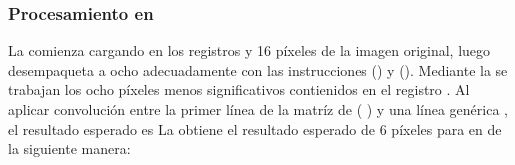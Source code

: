 \subsubsection{Procesamiento en }
	La   comienza cargando en los registros  y  16 píxeles de la imagen original, 
luego desempaqueta a ocho  adecuadamente con las instrucciones  () y  
(). Mediante la   se trabajan los ocho píxeles menos significativos contienidos en 
el registro . Al aplicar convolución entre la primer línea de la matríz de  ( 
) y una línea genérica 
, el resultado esperado es 
La   obtiene el resultado esperado de 6 píxeles para  en  de la siguiente manera:

\begin{center}
\end{center}

